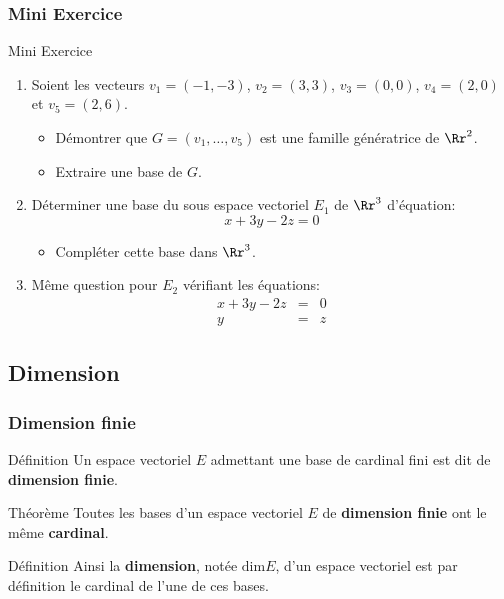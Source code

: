 \documentclass[dvipsnames]{beamer}
\begin{document}
\begin{frame}[t]
  \frametitle{Mini Exercice}
 \begin{block}{Mini Exercice}
\begin{enumerate}
  \scriptsize
  \item Soient les vecteurs $v_1=(-1,-3)$, $v_2=(3,3)$, $v_3=(0,0)$,
    $v_4=(2,0)$ et $v_5=(2,6)$.\\[8pt]

    \begin{itemize}
      \scriptsize
      \item Démontrer que $G=(v_1, \ldots, v_5)$ est une famille
        génératrice de $\Rr^2$.\\[4pt]
      \item Extraire une base de  $G$.
    \end{itemize}
  \item Déterminer une base du sous espace vectoriel $E_1$ de $\Rr^3$
    d'équation:
    \begin{equation*}
      x + 3y - 2z = 0
    \end{equation*}
    \begin{itemize}
      \scriptsize
      \item Compléter cette base dans $\Rr^3$.
    \end{itemize}
  \item Même question pour $E_2$ vérifiant les équations:
    \begin{eqnarray*}
      x + 3y -2z &=& 0\\
      y          &=& z
    \end{eqnarray*}
\end{enumerate}  
 \end{block}
\end{frame}
\subsection{Dimension}
\begin{frame}[t]
  \frametitle{Dimension finie}
 \begin{block}{Définition}
   \small
   Un espace vectoriel $E$ admettant une base de cardinal fini est dit de
   \textbf{\alert{dimension finie}}.
 \end{block} 
 \pause

 \begin{block}{Théorème}
   \small
   Toutes les  bases d'un espace vectoriel $E$ de \textbf{dimension finie}  ont
   le même \textbf{\alert{cardinal}}.
 \end{block}
 \pause

 \begin{block}{Définition}
   \small
   Ainsi la \alert{\textbf{dimension}}, notée $\text{dim} E$,  d'un espace
   vectoriel est par définition le cardinal de l'une de ces bases.
 \end{block}
\end{frame}
\end{document}
